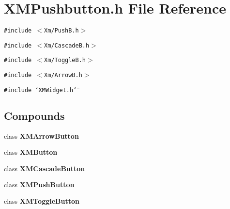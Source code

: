 \section{XMPushbutton.h File Reference}
\label{XMPushbutton_8h}
{\tt \#include $<$Xm/Push\-B.h$>$}\par
{\tt \#include $<$Xm/Cascade\-B.h$>$}\par
{\tt \#include $<$Xm/Toggle\-B.h$>$}\par
{\tt \#include $<$Xm/Arrow\-B.h$>$}\par
{\tt \#include \char`\"{}XMWidget.h\char`\"{}}\par
\subsection*{Compounds}
\begin{CompactItemize}
\item 
class {\bf XMArrow\-Button}
\item 
class {\bf XMButton}
\item 
class {\bf XMCascade\-Button}
\item 
class {\bf XMPush\-Button}
\item 
class {\bf XMToggle\-Button}
\end{CompactItemize}
